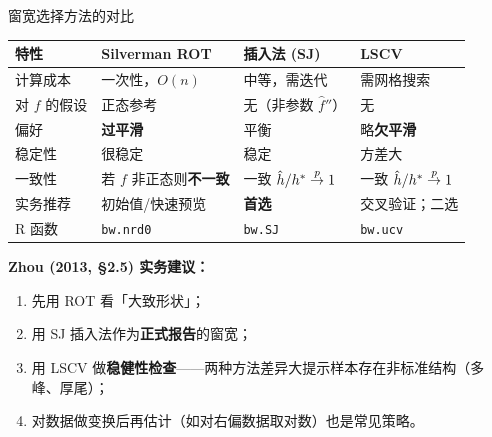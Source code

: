 \documentclass[aspectratio=169, 10pt]{beamer}
\renewcommand{\arraystretch}{1.05}
\begin{document}
\begin{frame}{窗宽选择方法的对比}
  \centering\small
  \renewcommand{\arraystretch}{1.3}
  \begin{tabular}{@{}p{3.0cm}p{3.5cm}p{3.5cm}p{3.3cm}@{}}
    \toprule
    \textbf{特性} & \textbf{Silverman ROT} & \textbf{插入法 (SJ)} & \textbf{LSCV} \\
    \midrule
    计算成本 & 一次性，$O(n)$ & 中等，需迭代 & 需网格搜索 \\
    对 $f$ 的假设 & 正态参考 & 无（非参数 $\hat f''$） & 无 \\
    偏好 & \textbf{过平滑} & 平衡 & 略\textbf{欠平滑} \\
    稳定性 & 很稳定 & 稳定 & 方差大 \\
    一致性 & 若 $f$ 非正态则\textbf{不一致} & 一致 $\hat h/h^*\overset{p}{\to} 1$ & 一致 $\hat h/h^*\overset{p}{\to} 1$ \\
    实务推荐 & 初始值/快速预览 & \textbf{首选} & 交叉验证；二选 \\
    R 函数 & \texttt{bw.nrd0} & \texttt{bw.SJ} & \texttt{bw.ucv} \\
    \bottomrule
  \end{tabular}


  \begin{keybox}
    \textbf{Zhou (2013, §2.5) 实务建议：}
    \begin{enumerate}
      \item 先用 ROT 看「大致形状」；
      \item 用 SJ 插入法作为\textbf{正式报告}的窗宽；
      \item 用 LSCV 做\textbf{稳健性检查}——两种方法差异大提示样本存在非标准结构（多峰、厚尾）；
      \item 对数据做变换后再估计（如对右偏数据取对数）也是常见策略。
    \end{enumerate}
  \end{keybox}

\end{frame}
\end{document}
